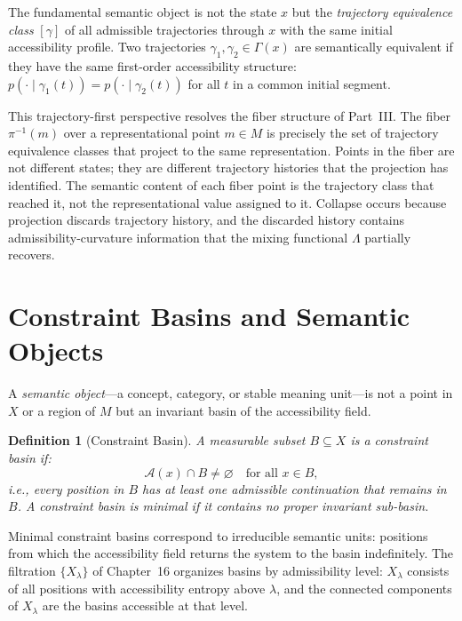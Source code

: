 \documentclass[12pt, oneside]{book}
\theoremstyle{plain-flyxion}
\theoremstyle{definition-flyxion}
\newtheorem{definition}[theorem]{Definition}
\newcommand{\A}{\mathcal{A}}
\newcommand{\Lam}{\Lambda}
\begin{document}
The fundamental semantic object is not the state $x$ but the \emph{trajectory equivalence
class} $[\gamma]$ of all admissible trajectories through $x$ with the same initial
accessibility profile. Two trajectories $\gamma_1, \gamma_2 \in \Gamma(x)$ are
semantically equivalent if they have the same first-order accessibility structure:
$p(\cdot \mid \gamma_1(t)) = p(\cdot \mid \gamma_2(t))$ for all $t$ in a common initial
segment.

This trajectory-first perspective resolves the fiber structure of Part~III. The fiber
$\pi^{-1}(m)$ over a representational point $m \in M$ is precisely the set of trajectory
equivalence classes that project to the same representation. Points in the fiber are not
different states; they are different trajectory histories that the projection has
identified. The semantic content of each fiber point is the trajectory class that reached
it, not the representational value assigned to it. Collapse occurs because projection
discards trajectory history, and the discarded history contains admissibility-curvature
information that the mixing functional $\Lam$ partially recovers.

\section{Constraint Basins and Semantic Objects}

A \emph{semantic object}---a concept, category, or stable meaning unit---is not a point
in $X$ or a region of $M$ but an invariant basin of the accessibility field.

\begin{definition}[Constraint Basin]\label{def:basin}
A measurable subset $B \subseteq X$ is a \emph{constraint basin} if:
\begin{equation}\label{eq:basin}
\A(x) \cap B \neq \varnothing \quad \text{for all } x \in B,
\end{equation}
i.e., every position in $B$ has at least one admissible continuation that remains in $B$.
A constraint basin is \emph{minimal} if it contains no proper invariant sub-basin.
\end{definition}

Minimal constraint basins correspond to irreducible semantic units: positions from which
the accessibility field returns the system to the basin indefinitely. The filtration
$\{X_\lambda\}$ of Chapter~16 organizes basins by admissibility level: $X_\lambda$
consists of all positions with accessibility entropy above $\lambda$, and the connected
components of $X_\lambda$ are the basins accessible at that level.
\end{document}
